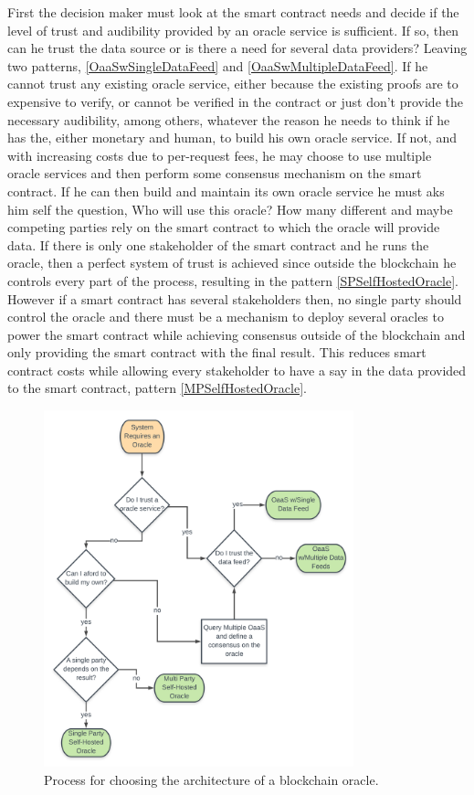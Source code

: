 First the decision maker must look at the smart contract needs and decide if the level of trust and audibility provided by an oracle service is sufficient. If so, then can he trust the data source or is there a need for several data providers? Leaving two patterns, \ref{OaaSwSingleDataFeed} and \ref{OaaSwMultipleDataFeed}.
If he cannot trust any existing oracle service, either because the existing proofs are to expensive to verify, or cannot be verified in the contract or just don't provide the necessary audibility, among others, whatever the reason he needs to think if he has the, either monetary and human, to build his own oracle service. If not, and with increasing costs due to per-request fees, he may choose to use multiple oracle services and then perform some consensus mechanism on the smart contract. If he can then build and maintain its own oracle service he must aks him self the question, Who will use this oracle? How many different and maybe competing parties rely on the smart contract to which the oracle will provide data. If there is only one stakeholder of the smart contract and he runs the oracle, then a perfect system of trust is achieved since outside the blockchain he controls every part of the process, resulting in the pattern \ref{SPSelfHostedOracle}. However if a smart contract has several stakeholders then, no single party should control the oracle and there must be a mechanism to deploy several oracles to power the smart contract while achieving consensus outside of the blockchain and only providing the smart contract with the final result. This reduces smart contract costs while allowing every stakeholder to have a say in the data provided to the smart contract, pattern \ref{MPSelfHostedOracle}.

\begin{figure}[t]
  \begin{center}
    \leavevmode
    \includegraphics[width=0.8\textwidth]{figures/oracle-pattern-flow.png}
    \caption{Process for choosing the architecture of a blockchain oracle.}
    \label{fig:/figures/oracle-pattern-flow}
  \end{center}
\end{figure}


